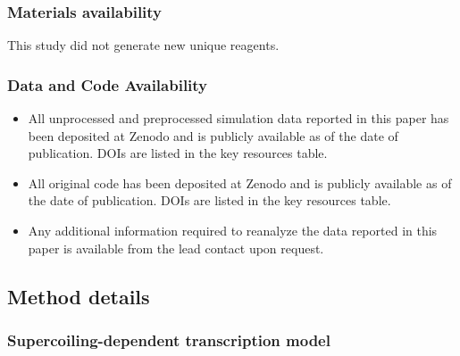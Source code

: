 \documentclass[11pt]{article} %
\begin{document}
\subsubsection{Materials availability}
This study did not generate new unique reagents.
\subsubsection{Data and Code Availability}
\begin{itemize}
    \item All unprocessed and preprocessed simulation data reported in this paper has been deposited at Zenodo and is publicly available as of the date of publication. DOIs are listed in the key resources table.
    \item All original code has been deposited at Zenodo and is publicly available as of the date of publication. DOIs are listed in the key resources table.
    \item Any additional information required to reanalyze the data reported in this paper is available from the lead contact upon request.
\end{itemize}

\subsection{Method details}


\subsubsection{Supercoiling-dependent transcription model}
\end{document}
